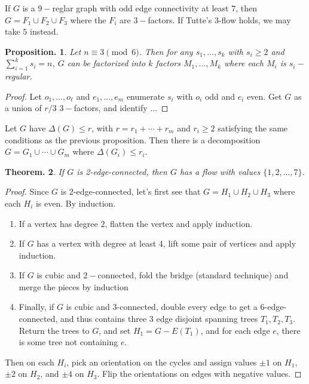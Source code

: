 \documentclass[11pt, a4paper]{memoir}
\theoremstyle{change}
\newtheorem{theorem}{Theorem.}[section]
\newtheorem{proposition}[theorem]{Proposition.}
\theoremstyle{plain}
\theoremstyle{nonumberplain}
\newtheorem{proof}{Proof}
\numberwithin{equation}{section}
\begin{document}
If $G$ is a $9-$reglar graph with odd edge connectivity at least $7$, then $G=F_1\cup F_2\cup F_3$ where the $F_i$ are $3-$factors.
If Tutte's 3-flow holds, we may take $5$ instead.
\begin{proposition}
    Let $n\equiv 3\pmod{6}$.
    Then for any $s_1,\ldots,s_k$ with $s_i\geq 2$ and $\sum_{i=1}^k s_i=n$, $G$ can be factorized into $k$ factors $M_1,\ldots,M_k$ where each $M_i$ is $s_i-$regular.
\end{proposition}
\begin{proof}
    Let $o_1,\ldots,o_\ell$ and $e_1,\ldots,e_m$ enumerate $s_i$ with $o_i$ odd and $e_i$ even.
    Get $G$ as a union of $r/3$ $3-$factors, and identify ...
\end{proof}
Let $G$ have $\Delta(G)\leq r$, with $r=r_1+\cdots+r_m$ and $r_i\geq 2$ satisfying the same conditions as the previous proposition.
Then there is a decomposition $G=G_1\cup\cdots\cup G_m$ where $\Delta(G_i)\leq r_i$.

\begin{theorem}
    If $G$ is 2-edge-connected, then $G$ has a flow with values $\{1,2,\ldots,7\}$.
\end{theorem}
\begin{proof}
    Since $G$ is 2-edge-connected, let's first see that $G=H_1\cup H_2\cup H_3$ where each $H_i$ is even.
    By induction.
    \begin{enumerate}[nl,r]
        \item If a vertex has degree $2$, flatten the vertex and apply induction.
        \item If $G$ has a vertex with degree at least 4, lift some pair of vertices and apply induction.
        \item If $G$ is cubic and $2-$connected, fold the bridge (standard technique) and merge the pieces by induction
        \item Finally, if $G$ is cubic and 3-connected, double every edge to get a 6-edge-connected, and thus contains three 3 edge disjoint spanning trees $T_1,T_2,T_3$.
            Return the trees to $G$, and set $H_1=G-E(T_1)$, and for each edge $e$, there is some tree not containing $e$.
    \end{enumerate}

    Then on each $H_i$, pick an orientation on the cycles and assign values $\pm 1$ on $H_1$, $\pm 2$ on $H_2$, and $\pm 4$ on $H_3$.
    Flip the orientations on edges with negative values.
\end{proof}
\end{document}
